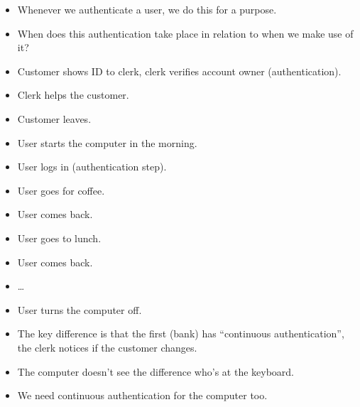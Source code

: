 \begin{frame}
  \begin{remark}
    \begin{itemize}
      \item Whenever we authenticate a user, we do this for a purpose.

      \item When does this authentication take place in relation to when we make 
        use of it?
    \end{itemize}
  \end{remark}
\end{frame}

\begin{frame}
  \begin{example}
    \begin{itemize}
      \item Customer shows ID to clerk, clerk verifies account owner 
        (authentication).
      \item Clerk helps the customer.
      \item Customer leaves.
    \end{itemize}
  \end{example}
\end{frame}

\begin{frame}
  \begin{example}
    \begin{itemize}
      \item User starts the computer in the morning.
      \item User logs in (authentication step).
      \item User goes for coffee.
      \item User comes back.
      \item User goes to lunch.
      \item User comes back.
      \item \dots
      \item User turns the computer off.
    \end{itemize}
  \end{example}
\end{frame}

\begin{frame}
  \begin{remark}
    \begin{itemize}
      \item The key difference is that the first (bank) has \enquote{continuous 
          authentication}, the clerk notices if the customer changes.

      \item The computer doesn't see the difference who's at the keyboard.
      \item We need continuous authentication for the computer too.
    \end{itemize}
  \end{remark}
\end{frame}

